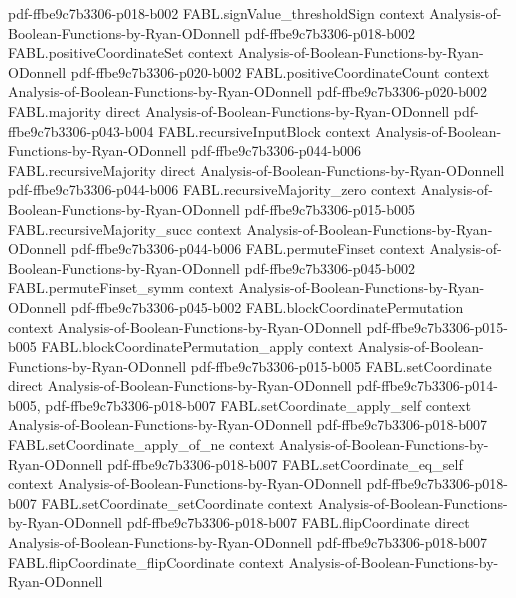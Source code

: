 \begin{theorem}
  {pdf-ffbe9c7b3306-p018-b002}
\proofstep
  {FABL.signValue_thresholdSign}
  {context}
  {Analysis-of-Boolean-Functions-by-Ryan-ODonnell}
  {pdf-ffbe9c7b3306-p018-b002}
\proofstep
  {FABL.positiveCoordinateSet}
  {context}
  {Analysis-of-Boolean-Functions-by-Ryan-ODonnell}
  {pdf-ffbe9c7b3306-p020-b002}
\proofstep
  {FABL.positiveCoordinateCount}
  {context}
  {Analysis-of-Boolean-Functions-by-Ryan-ODonnell}
  {pdf-ffbe9c7b3306-p020-b002}
\proofstep
  {FABL.majority}
  {direct}
  {Analysis-of-Boolean-Functions-by-Ryan-ODonnell}
  {pdf-ffbe9c7b3306-p043-b004}
\proofstep
  {FABL.recursiveInputBlock}
  {context}
  {Analysis-of-Boolean-Functions-by-Ryan-ODonnell}
  {pdf-ffbe9c7b3306-p044-b006}
\proofstep
  {FABL.recursiveMajority}
  {direct}
  {Analysis-of-Boolean-Functions-by-Ryan-ODonnell}
  {pdf-ffbe9c7b3306-p044-b006}
\proofstep
  {FABL.recursiveMajority_zero}
  {context}
  {Analysis-of-Boolean-Functions-by-Ryan-ODonnell}
  {pdf-ffbe9c7b3306-p015-b005}
\proofstep
  {FABL.recursiveMajority_succ}
  {context}
  {Analysis-of-Boolean-Functions-by-Ryan-ODonnell}
  {pdf-ffbe9c7b3306-p044-b006}
\proofstep
  {FABL.permuteFinset}
  {context}
  {Analysis-of-Boolean-Functions-by-Ryan-ODonnell}
  {pdf-ffbe9c7b3306-p045-b002}
\proofstep
  {FABL.permuteFinset_symm}
  {context}
  {Analysis-of-Boolean-Functions-by-Ryan-ODonnell}
  {pdf-ffbe9c7b3306-p045-b002}
\proofstep
  {FABL.blockCoordinatePermutation}
  {context}
  {Analysis-of-Boolean-Functions-by-Ryan-ODonnell}
  {pdf-ffbe9c7b3306-p015-b005}
\proofstep
  {FABL.blockCoordinatePermutation_apply}
  {context}
  {Analysis-of-Boolean-Functions-by-Ryan-ODonnell}
  {pdf-ffbe9c7b3306-p015-b005}
\proofstep
  {FABL.setCoordinate}
  {direct}
  {Analysis-of-Boolean-Functions-by-Ryan-ODonnell}
  {pdf-ffbe9c7b3306-p014-b005,
    pdf-ffbe9c7b3306-p018-b007}
\proofstep
  {FABL.setCoordinate_apply_self}
  {context}
  {Analysis-of-Boolean-Functions-by-Ryan-ODonnell}
  {pdf-ffbe9c7b3306-p018-b007}
\proofstep
  {FABL.setCoordinate_apply_of_ne}
  {context}
  {Analysis-of-Boolean-Functions-by-Ryan-ODonnell}
  {pdf-ffbe9c7b3306-p018-b007}
\proofstep
  {FABL.setCoordinate_eq_self}
  {context}
  {Analysis-of-Boolean-Functions-by-Ryan-ODonnell}
  {pdf-ffbe9c7b3306-p018-b007}
\proofstep
  {FABL.setCoordinate_setCoordinate}
  {context}
  {Analysis-of-Boolean-Functions-by-Ryan-ODonnell}
  {pdf-ffbe9c7b3306-p018-b007}
\proofstep
  {FABL.flipCoordinate}
  {direct}
  {Analysis-of-Boolean-Functions-by-Ryan-ODonnell}
  {pdf-ffbe9c7b3306-p018-b007}
\proofstep
  {FABL.flipCoordinate_flipCoordinate}
  {context}
  {Analysis-of-Boolean-Functions-by-Ryan-ODonnell}

\end{theorem}
